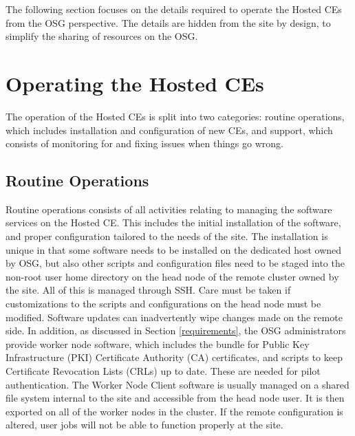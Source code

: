 \documentclass{webofc}
\begin{document}
The following section focuses on the details required to operate the Hosted CEs from the OSG perspective. The details are hidden from the site by design, to simplify the sharing of resources on the OSG.

\section{Operating the Hosted CEs}
\label{operations}
The operation of the Hosted CEs is split into two categories: routine operations, which includes installation and configuration of new CEs, and support, which consists of monitoring for and fixing issues when things go wrong.

\subsection{Routine Operations}
\label{routine}

Routine operations consists of all activities relating to managing the software services on the Hosted CE. This includes the initial installation of the software, and proper configuration tailored to the needs of the site. The installation is unique in that some software needs to be installed on the dedicated host owned by OSG, but also other scripts and configuration files need to be staged into the non-root user home directory on the head node of the remote cluster owned by the site. All of this is managed through SSH. Care must be taken if customizations to the scripts and configurations on the head node must be modified. Software updates can inadvertently wipe changes made on the remote side. In addition, as discussed in Section \ref{requirements}, the OSG administrators provide worker node software, which includes the bundle for Public Key Infrastructure \cite{foster1998security} (PKI) Certificate Authority (CA) certificates, and scripts to keep Certificate Revocation Lists (CRLs) up to date. These are needed for pilot authentication. The Worker Node Client software is usually managed on a shared file system internal to the site and accessible from the head node user. It is then exported on all of the worker nodes in the cluster. If the remote configuration is altered, user jobs will not be able to function properly at the site.
\end{document}
